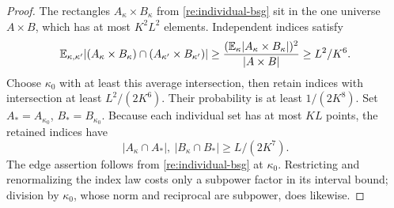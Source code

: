 \begin{proof}
The rectangles \(A_\kappa\times B_\kappa\) from
\eqref{re:individual-bsg} sit in the one universe \(A\times B\),
which has at most \(K^2L^2\) elements.  Independent indices satisfy
\[
 \mathbb E_{\kappa,\kappa'}
 |(A_\kappa\times B_\kappa)\cap
   (A_{\kappa'}\times B_{\kappa'})|
 \ge\frac{(\mathbb E_\kappa|A_\kappa\times B_\kappa|)^2}{|A\times B|}
 \ge L^2/K^6.
\]
Choose \(\kappa_0\) with at least this average intersection, then
retain indices with intersection at least \(L^2/(2K^6)\).  Their
probability is at least \(1/(2K^8)\).  Set
\(A_*=A_{\kappa_0}\), \(B_*=B_{\kappa_0}\).  Because each
individual set has at most \(KL\) points, the retained indices have
\[
 |A_\kappa\cap A_*|,\ |B_\kappa\cap B_*|\ge L/(2K^7).
\]
The edge assertion follows from \eqref{re:individual-bsg} at
\(\kappa_0\).  Restricting and renormalizing the index law costs only
a subpower factor in its interval bound; division by
\(\kappa_0\), whose norm and reciprocal are subpower, does likewise.


\end{proof}
